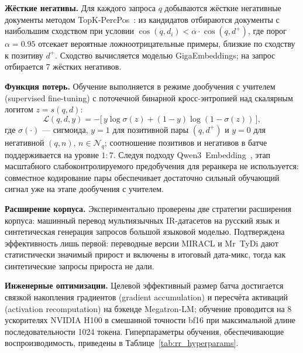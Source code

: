 \textbf{Жёсткие негативы.} Для каждого запроса $q$ добываются жёсткие негативные документы методом TopK-PercPos~\cite{2405.17428}: из кандидатов отбираются документы с наибольшим сходством при условии $\cos(q, d_i) < \alpha \cdot \cos(q, d^+)$, где порог $\alpha = 0.95$ отсекает вероятные ложноотрицательные примеры, близкие по сходству к позитиву $d^+$.
Сходство вычисляется моделью GigaEmbeddings; на запрос отбирается 7 жёстких негативов.

\textbf{Функция потерь.} Обучение выполняется в режиме дообучения с учителем (supervised fine-tuning) с поточечной бинарной кросс-энтропией над скалярным логитом $z = s(q, d)$:
\begin{equation}
\label{eq:rr_loss}
    \mathcal{L}(q, d, y) = -\big[\,y \log \sigma(z) + (1 - y) \log(1 - \sigma(z))\,\big],
\end{equation}
где $\sigma(\cdot)$ --- сигмоида, $y = 1$ для позитивной пары $(q, d^+)$ и $y = 0$ для негативной $(q, n)$, $n \in \mathcal{N}_q$; соотношение позитивов и негативов в батче поддерживается на уровне $1{:}7$.
Следуя подходу Qwen3~Embedding~\cite{2506.05176}, этап масштабного слабоконтролируемого предобучения для реранкера не используется: совместное кодирование пары обеспечивает достаточно сильный обучающий сигнал уже на этапе дообучения с учителем.

\textbf{Расширение корпуса.} Экспериментально проверены две стратегии расширения корпуса: машинный перевод мультиязычных IR-датасетов на русский язык и синтетическая генерация запросов большой языковой моделью.
Подтверждена эффективность лишь первой: переводные версии MIRACL и Mr~TyDi дают статистически значимый прирост и включены в итоговый дата-микс, тогда как синтетические запросы прироста не дали.

\textbf{Инженерные оптимизации.} Целевой эффективный размер батча достигается связкой накопления градиентов (gradient accumulation) и пересчёта активаций (activation recomputation) на бэкенде Megatron-LM; обучение проводится на 8 ускорителях NVIDIA H100 в смешанной точности bf16 при максимальной длине последовательности 1024 токена.
Гиперпараметры обучения, обеспечивающие воспроизводимость, приведены в Таблице~\ref{tab:rr_hyperparams}.

